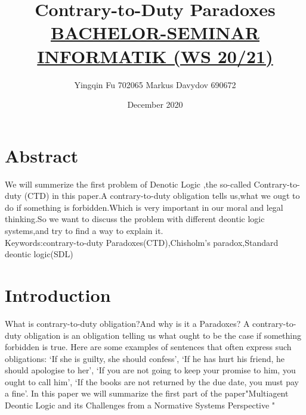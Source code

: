 \documentclass{article}
\title{Contrary-to-Duty Paradoxes\\{\normalsize  \underline{BACHELOR-SEMINAR INFORMATIK  (WS 20/21)}}}
\author{Yingqin Fu 702065 Markus Davydov 690672 }
\date{December 2020}
\begin{document}
\maketitle

\tableofcontents
\section*{Abstract}
We will summerize the first problem of Denotic Logic ,the so-called Contrary-to-duty (CTD) in this paper.A contrary-to-duty obligation tells us,what we ougt to do if something is forbidden.Which is very important in our moral and legal thinking.So we want to discuss the problem with different deontic logic systems,and try to find a way to explain it.\\
Keywords:contrary-to-duty Paradoxes(CTD),Chisholm’s paradox,Standard deontic logic(SDL)
\section*{Introduction}
What is contrary-to-duty obligation?And why is it a Paradoxes? A contrary-to-duty obligation is an obligation telling us what ought to be the case if something forbidden is true. Here are some examples of sentences that often express such obligations: ‘If she is guilty, she should confess’, ‘If he has hurt his friend, he should apologise to her’, ‘If you are not going to keep your promise to him, you ought to call him’, ‘If the books are not returned by the due date, you must pay a fine’. In this paper we will summarize the first part of the paper"Multiagent Deontic Logic and its Challenges from a Normative Systems Perspective "\cite{1} 
\end{document}
